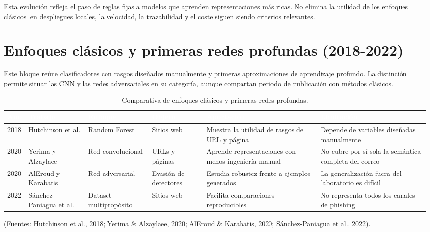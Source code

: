 \documentclass[11pt,a4paper,oneside]{report}
\begin{document}
Esta evolución refleja el paso de reglas fijas a modelos que aprenden representaciones más ricas. No elimina la utilidad de los enfoques clásicos: en despliegues locales, la velocidad, la trazabilidad y el coste siguen siendo criterios relevantes.

\section{Enfoques clásicos y primeras redes profundas (2018-2022)}

Este bloque reúne clasificadores con rasgos diseñados manualmente y primeras aproximaciones de aprendizaje profundo. La distinción permite situar las CNN y las redes adversariales en su categoría, aunque compartan periodo de publicación con métodos clásicos.

\begingroup
\begin{table}[H]
  \centering
  \small
  \caption{Comparativa de enfoques clásicos y primeras redes profundas.}
  \label{tab:3-1}
  \begin{tabularx}{\textwidth}{|X|X|X|X|X|X|}
    \hline
    \rowcolor{uemcgreen}
    \textcolor{white}{\textbf{Año}} & \textcolor{white}{\textbf{Trabajo}} & \textcolor{white}{\textbf{Enfoque}} & \textcolor{white}{\textbf{Objeto}} & \textcolor{white}{\textbf{Aportación}} & \textcolor{white}{\textbf{Limitación}} \\
    \hline
    2018 & Hutchinson et al. & Random Forest & Sitios web & Muestra la utilidad de rasgos de URL y página & Depende de variables diseñadas manualmente \\
    \hline
    \rowcolor{tablelight}
    2020 & Yerima y Alzaylaee & Red convolucional & URLs y páginas & Aprende representaciones con menos ingeniería manual & No cubre por sí sola la semántica completa del correo \\
    \hline
    2020 & AlEroud y Karabatis & Red adversarial & Evasión de detectores & Estudia robustez frente a ejemplos generados & La generalización fuera del laboratorio es difícil \\
    \hline
    \rowcolor{tablelight}
    2022 & Sánchez-Paniagua et al. & Dataset multipropósito & Sitios web & Facilita comparaciones reproducibles & No representa todos los canales de phishing \\
    \hline
  \end{tabularx}
\end{table}
\endgroup

\begin{center}
  \footnotesize (Fuentes: Hutchinson et al., 2018; Yerima \& Alzaylaee, 2020; AlEroud \& Karabatis, 2020; Sánchez-Paniagua et al., 2022).
\end{center}
\end{document}
